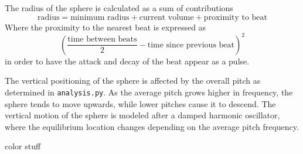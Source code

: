 \documentclass{article}
\newcommand{\code}{\texttt}
\begin{document}
The radius of the sphere is calculated as a sum of contributions
$$\text{radius} = \text{minimum radius} + \text{current volume} + \text{proximity to beat}$$
Where the proximity to the nearest beat is expressed as
$$\left( \frac{\text{time between beats}}{2} - \text{time since previous beat} \right)^2$$
in order to have the attack and decay of the beat appear as a pulse.

The vertical positioning of the sphere is affected by the overall pitch as determined in \code{analysis.py}. As the average pitch grows higher in frequency, the sphere tends to move upwards, while lower pitches cause it to descend. The vertical motion of the sphere is modeled after a damped harmonic oscillator, where the equilibrium location changes depending on the average pitch frequency.

color stuff
\end{document}
